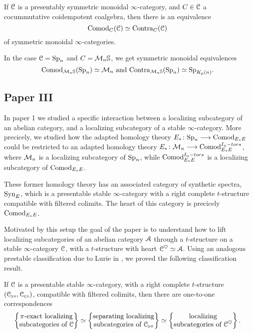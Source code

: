 \begin{theorem}
    If $\EuScript{C}$ is a presentably symmetric monoidal $\infty$-category, and $C\in \EuScript{C}$ a cocummutative coidempotent coalgebra, then there is an equivalence 
    \[\mathrm{Comod}_C(\EuScript{C})\simeq \mathrm{Contra}_C(\EuScript{C})\]
    of symmetric monoidal $\infty$-categories. 
\end{theorem}

\begin{example}
    In the case $\EuScript{C}= \mathrm{Sp}_{n}$ and $C = \mathcal{M}_{n}\mathbb{S}$, we get symmetric monoidal equivalences 
    \[\mathrm{Comod}_{\mathcal{M}_{n}\mathbb{S}}(\mathrm{Sp}_{n}) \simeq \mathcal{M}_{n} \text{ and } \mathrm{Contra}_{\mathcal{M}_{n}\mathbb{S}}(\mathrm{Sp}_{n})\simeq \mathrm{Sp}_{K_p(n)}.\]
\end{example}




\subsection{Paper III}

In paper 1 we studied a specific interaction between a localizing subcategory of an abelian category, and a localizing subcategory of a stable $\infty$-category. More precicely, we studied how the adapted homology theory $E_* \colon \mathrm{Sp}_{n} \longrightarrow \mathrm{Comod}_{E_*E}$ could be restricted to an adapted homology theory $E_* \colon \mathcal{M}_{n} \longrightarrow \mathrm{Comod}_{E_*E}^{I_n-tors}$, where $\mathcal{M}_{n}$ is a localizing subcategory of $\mathrm{Sp}_{n}$, while $\mathrm{Comod}_{E_*E}^{I_n-tors}$ is a localizing subcategory of $\mathrm{Comod}_{E_*E}$. 

These former homology theory has an associated category of synthetic spectra, $\mathrm{Syn}_{E}$, which is a presentable stable $\infty$-category with a right complete $t$-structure compatible with filtered colimits. The heart of this category is precicely $\mathrm{Comod}_{E_*E}$. 

Motivated by this setup the goal of the paper \cite{aambo_2024_localizing} is to understand how to lift localizing subcategories of an abelian category $\EuScript{A}$ through a $t$-structure on a stable $\infty$-category $\EuScript{C}$, with a $t$-structure with heart $\EuScript{C}^\heartsuit \simeq \EuScript{A}$. Using an analogous prestable classification due to Lurie in \citeme, we proved the following classification result. 

\begin{theorem}
    If $\EuScript{C}$ is a presentable stable $\infty$-category, with a right complete $t$-structure $(\EuScript{C}_{\hspace{-1pt}\scriptscriptstyle\geqslant 0}, \EuScript{C}_{\hspace{-1pt}\scriptscriptstyle\leqslant 0})$, compatible with filtered colimits, then there are one-to-one correspondences 
    \[\left\{ \begin{matrix} \pi\text{-exact localizing}\\ \text{subcategories of }\EuScript{C} \end{matrix} \right\} \simeq \left\{ \begin{matrix} \text{separating localizing}\\ \text{subcategories of }\EuScript{C}_{\hspace{-1pt}\scriptscriptstyle\geqslant 0} \end{matrix} \right\} \simeq \left\{ \begin{matrix} \text{localizing}\\ \text{subcategories of }\EuScript{C}^\heartsuit \end{matrix} \right\}.\]
\end{theorem}
